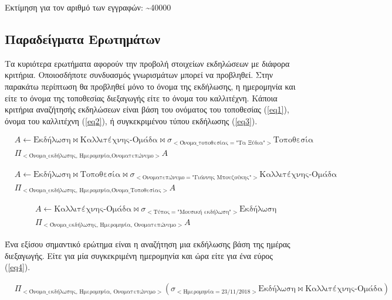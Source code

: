 Εκτίμηση για τον αριθμό των εγγραφών: \textasciitilde 40000

\subsection{Παραδείγματα Ερωτημάτων}

Τα κυριότερα ερωτήματα αφορούν την προβολή στοιχείων εκδηλώσεων με
διάφορα κριτήρια. Οποιοσδήποτε συνδυασμός γνωρισμάτων μπορεί να
προβληθεί. Στην παρακάτω περίπτωση θα προβληθεί μόνο το όνομα της
εκδήλωσης, η ημερομηνία και είτε το όνομα της τοποθεσίας διεξαγωγής
είτε το όνομα του καλλιτέχνη.  Κάποια κριτήρια αναζήτησής εκδηλώσεων
είναι βάση του ονόματος του τοποθεσίας (\ref{eq1}), όνομα του
καλλιτέχνη (\ref{eq2}), ή συγκεκριμένου τύπου εκδήλωσης (\ref{eq3}).

\begin{equation} \label{eq1}
\begin{split}
&A \leftarrow \text{Εκδήλωση} \bowtie
\text{Καλλιτέχνης-Ομάδα} \bowtie
\sigma_{<\text{Όνομα\_τοποθεσίας} = \text{"Τα Ξύδια"}>}
\text{Τοποθεσία}
\\
&\Pi_{<\text{Όνομα\_εκδήλωσης, Ημερομηνία,Ονοματεπώνυμο}>}A
\end{split}
\end{equation}

\begin{equation} \label{eq2}
\begin{split}
&A \leftarrow \text{Εκδήλωση} \bowtie
\text{Τοποθεσία} \bowtie
\sigma_{<\text{Ονοματεπώνυμο} = \text{"Γιάννης Μπουζούκης"}>}
\text{Καλλιτέχνης-Ομάδα}
\\
&\Pi_{<\text{Όνομα\_εκδήλωσης, Ημερομηνία,Όνομα\_Τοποθεσίας}>}A
\end{split}
\end{equation}

\begin{equation} \label{eq3}
\begin{split}
&A \leftarrow \text{Καλλιτέχνης-Ομάδα} \bowtie
\sigma_{<\text{Τύπος} = \text{"Μουσική εκδήλωση"}>}\text{Εκδήλωση}
\\
&\Pi_{<\text{Όνομα\_εκδήλωσης, Ημερομηνία, Ονοματεπώνυμο}>}A
\end{split}
\end{equation}

Ένα εξίσου σημαντικό ερώτημα  είναι η αναζήτηση μια εκδήλωσης βάση της
ημέρας διεξαγωγής. Είτε για μία συγκεκριμένη ημερομηνία και ώρα είτε
για ένα εύρος (\ref{eq4}).

\begin{equation}
  \label{eq4}
  \begin{split}
    &\Pi_{<\text{Όνομα\_εκδήλωσης, Ημερομηνία, Ονοματεπώνυμο}>}(
    \sigma_{<\text{Ημερομηνία} = 23/11/2018>} \text{Εκδήλωση} \bowtie
    \text{Καλλιτέχνης-Ομάδα})
  \end{split}
\end{equation}

